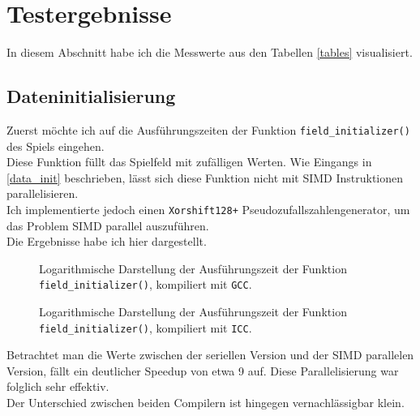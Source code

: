 \documentclass[german,plainarticle,hyperref,utf8]{zihpub}
\begin{document}
	\newpage
	\section{Testergebnisse} \label{erg}
	In diesem Abschnitt habe ich die Messwerte aus den Tabellen \ref{tables} visualisiert.
	\subsection{Dateninitialisierung}
	Zuerst möchte ich auf die Ausführungszeiten der Funktion \texttt{field\_initializer()} des Spiels eingehen.\\
	Diese Funktion füllt das Spielfeld mit zufälligen Werten. Wie Eingangs in \ref{data_init} beschrieben, lässt sich diese Funktion nicht mit SIMD Instruktionen parallelisieren.\\
	Ich implementierte jedoch einen \texttt{Xorshift128+} Pseudozufallszahlengenerator, um das Problem SIMD parallel auszuführen.\\
	Die Ergebnisse habe ich hier dargestellt.
	
	\begin{figure}[h]
		\centering
		\caption{Logarithmische Darstellung der Ausführungszeit der Funktion \texttt{field\_initializer()}, kompiliert mit \texttt{GCC}.}
	\end{figure}
	\begin{figure}[h]
		\centering
		\caption{Logarithmische Darstellung der Ausführungszeit der Funktion \texttt{field\_initializer()}, kompiliert mit \texttt{ICC}.}
	\end{figure}
	\newpage
	Betrachtet man die Werte zwischen der seriellen Version und der SIMD parallelen Version, fällt ein deutlicher Speedup von etwa 9 auf. Diese Parallelisierung war folglich sehr effektiv.\\
	Der Unterschied zwischen beiden Compilern ist hingegen vernachlässigbar klein.
	\clearpage
\end{document}
